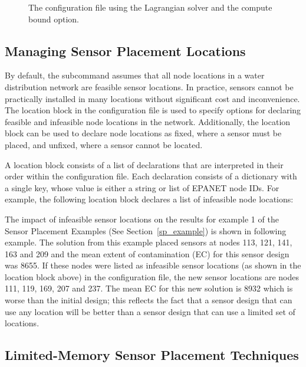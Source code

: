 \begin{figure}[h]
  \caption{The  configuration file using the Lagrangian solver and the compute bound option.}
  \label{fig:sp_bound_only_lag}
\end{figure}

\subsection{Managing Sensor Placement Locations}\label{solvers_solvers2c}

By default, the  subcommand assumes that all node locations in
a water distribution network are feasible sensor locations. 
In practice, sensors cannot be practically installed in many locations without
significant cost and inconvenience. The location block in the 
configuration file is used to specify options for declaring feasible and infeasible
node locations in the network. Additionally, the location block
can be used to declare node locations as fixed, where a sensor must be
placed, and unfixed, where a sensor cannot be located.

A location block consists of a list of declarations that are
interpreted in their order within the configuration file. Each
declaration consists of a dictionary with a single key, whose value
is either a string or list of EPANET node IDs. For example, the following location
block declares a list of infeasible node locations:

The impact of infeasible sensor locations on the results
for example 1 of the Sensor Placement Examples (See
Section~\ref{sp_example}) is shown in following example. The solution from this example placed
sensors at nodes 113, 121, 141, 163 and 209 and the mean extent of
contamination (EC) for this sensor design was 8655. If these nodes
were listed as infeasible sensor locations (as shown in the location
block above) in the configuration file, the new sensor locations
are nodes 111, 119, 169, 207 and 237. The mean EC for this new
solution is 8932 which is worse than the initial design; this
reflects the fact that a sensor design that can use any location
will be better than a sensor design that can use a limited set of
locations.


\subsection{Limited-\/Memory Sensor Placement Techniques}\label{solvers_solvers5}

